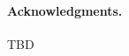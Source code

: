 \documentclass[]{acm_proc_article-sp}
\numberwithin{equation}{subsection}
\begin{document}
\paragraph{Acknowledgments.}
TBD \\







\end{document}
